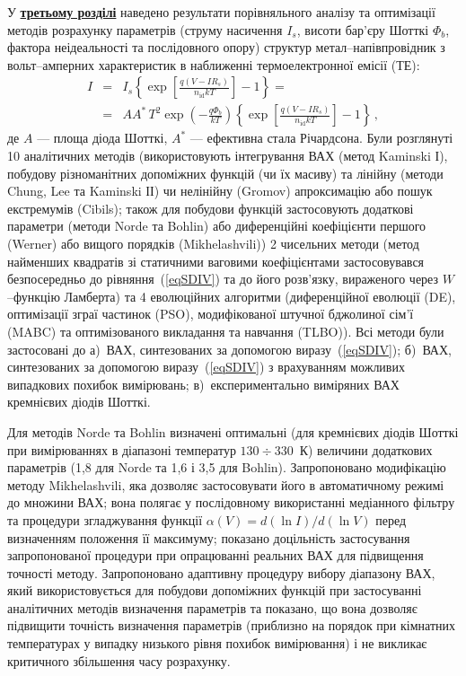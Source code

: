 У  \underline{\textbf{третьому розділі}} наведено результати порівняльного аналізу та оптимізації методів розрахунку параметрів (струму насичення  $I_s$, висоти бар'єру Шотткі  $\Phi_b$, фактора неідеальності та послідовного опору) структур метал--напівпровідник з вольт--амперних характеристик в наближенні термоелектронної емісії (ТЕ):
\begin{eqnarray}
\label{eqSDIV}
\nonumber I&=&I_s\left\{\exp\left[\frac{q(V-IR_s)}{n_\mathrm{id}kT}\right]-1\right\}=\\
&=&AA^*\,T^2\exp\left(-\frac{q\Phi_b}{kT}\right)\left\{\exp\left[\frac{q(V-IR_s)}{n_\mathrm{id}kT}\right]-1\right\}\,,
\end{eqnarray}
де
$A$ --- площа діода Шотткі,
$A^*$ --- ефективна стала Річардсона.
Були розглянуті 10 аналітичних методів (використовують інтегрування ВАХ (метод Kaminski І), побудову різноманітних допоміжних функцій (чи їх масиву) та лінійну (методи Chung, Lee та Kaminski ІІ) чи нелінійну (Gromov) апроксимацію або пошук екстремумів (Cibils);
також для побудови функцій застосовують додаткові параметри (методи Norde та Bohlin) або диференційні коефіцієнти першого (Werner) або вищого порядків (Mikhelashvili))
2 чисельних методи (метод найменших квадратів зі статичними ваговими коефіцієнтами застосовувався безпосередньо до рівняння~(\ref{eqSDIV}) та до його розв'язку, вираженого через $W$--функцію Ламберта) та
4 еволюційних алгоритми (диференційної еволюції (DE),
оптимізації зграї частинок (PSO),
модифікованої штучної бджолиної сім'ї (MABC) та
оптимізованого викладання та навчання (TLBO)).
Всі методи були застосовані до
а)~ВАХ, синтезованих за допомогою виразу~(\ref{eqSDIV});
б)~ВАХ, синтезованих за допомогою виразу~(\ref{eqSDIV}) з врахуванням можливих випадкових похибок вимірювань;
в)~експериментально виміряних ВАХ кремнієвих діодів Шотткі.

Для методів Norde та Bohlin визначені  оптимальні (для кремнієвих діодів Шотткі при вимірюваннях в діапазоні температур $130\div330$~К) величини додаткових параметрів (1,8 для Norde та 1,6 і 3,5 для Bohlin).
Запропоновано модифікацію методу Mikhelashvili, яка дозволяє застосовувати його в автоматичному режимі до множини ВАХ;
вона полягає у послідовному використанні медіанного фільтру та процедури згладжування функції $\alpha(V)=d(\ln I)/d(\ln V)$ перед визначенням положення її максимуму;
показано доцільність застосування запропонованої процедури при опрацюванні реальних ВАХ для підвищення точності методу.
Запропоновано адаптивну процедуру вибору діапазону ВАХ, який використовується для побудови допоміжних функцій при застосуванні аналітичних методів визначення параметрів та показано, що вона дозволяє підвищити точність визначення параметрів (приблизно на порядок при кімнатних температурах у випадку низького рівня похибок вимірювання) і не викликає критичного збільшення часу розрахунку.

